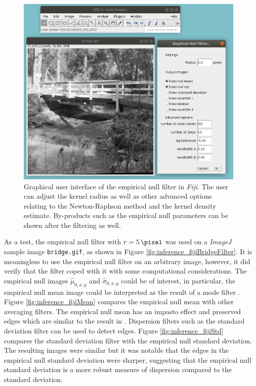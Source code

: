 \begin{figure}
    \centering
    \includegraphics[width=\textwidth]{../figures/inference/fiji/gui.png}
    \caption{Graphical user interface of the empirical null filter in \emph{Fiji}. The user can adjust the kernel radius as well as other advanced options relating to the Newton-Raphson method and the kernel density estimate. By-products such as the empirical null parameters can be shown after the filtering as well.}
    \label{fig:inference_fijiGui}
\end{figure}

As a test, the empirical null filter with $r=\SI{5}{\pixel}$ was used on a \emph{ImageJ} sample image \texttt{bridge.gif}, as shown in Figure \ref{fig:inference_fijiBridgeFilter}. It is meaningless to use the empirical null filter on an arbitrary image, however, it did verify that the filter coped with it with some computational considerations. The empirical null images $\widehat{\mu}_{0,x,y}$ and $\widehat{\sigma}_{0,x,y}$ could be of interest, in particular, the empirical null mean image could be interpreted as the result of a mode filter \citep{griffin2000mean}. Figure \ref{fig:inference_fijiMean} compares the empirical null mean with other averaging filters. The empirical null mean has an impasto effect and preserved edges which are similar to the result in \cite{griffin2000mean}. Dispersion filters such as the standard deviation filter can be used to detect edges. Figure \ref{fig:inference_fijiStd} compares the standard deviation filter with the empirical null standard deviation. The resulting images were similar but it was notable that the edges in the empirical null standard deviation were sharper, suggesting that the empirical null standard deviation is a more robust measure of dispersion compared to the standard deviation.

